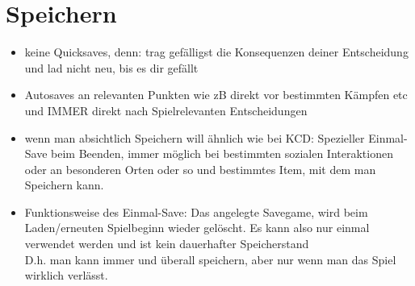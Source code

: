 \chapter{Speichern}
\begin{itemize}
	\item keine Quicksaves, denn: trag gefälligst die Konsequenzen deiner Entscheidung und lad nicht neu, bis es dir gefällt
	\item Autosaves an relevanten Punkten wie zB direkt vor bestimmten Kämpfen etc und IMMER direkt nach Spielrelevanten Entscheidungen
	\item wenn man absichtlich Speichern will ähnlich wie bei KCD: Spezieller Einmal-Save beim Beenden, immer möglich bei bestimmten sozialen Interaktionen oder an besonderen Orten oder so und bestimmtes Item, mit dem man Speichern kann.
	\item Funktionsweise des Einmal-Save: Das angelegte Savegame, wird beim Laden/erneuten Spielbeginn wieder gelöscht. Es kann also nur einmal verwendet werden und ist kein dauerhafter Speicherstand\\
	D.h. man kann immer und überall speichern, aber nur wenn man das Spiel wirklich verlässt.
\end{itemize}
